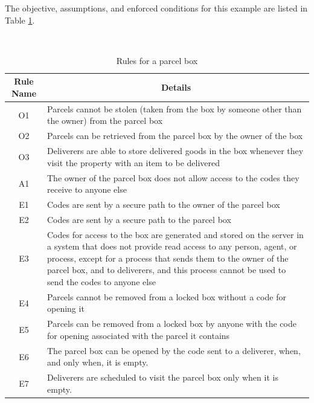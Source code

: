 The objective, assumptions, and enforced conditions for this example are listed
in Table \ref{parcelrules}.
\begin{table}[tb]
\centering
\caption{Rules for a parcel box}\label{parcelrules}\ \\
\begin{center}
\begin{tabular}{|c|p{9cm}|}
\hline
\bf Rule Name&\multicolumn{1}{|c|}{\bf Details}\\
\hline
O1 & Parcels cannot be stolen (taken from the box by someone other than the owner) from the parcel box\\
O2 & Parcels can be retrieved from the parcel box by the owner of the box\\
O3 & Deliverers are able to store delivered goods in the box whenever they visit the
property with an item to be delivered\\
A1 & The owner of the parcel box does not allow access to the codes they receive to anyone else\\
E1 & Codes are sent by a secure path to the owner of the parcel box\\
E2 & Codes are sent by a secure path to the parcel box\\
E3 & Codes for access to the box are generated and stored on the server in a system that does not 
provide read access to any person, agent, or process, except for a process that sends them to the owner 
of the parcel box, and to deliverers, and this process cannot be used to send the codes to anyone else\\
E4 & Parcels cannot be removed from a locked box without a code for opening it\\
E5 & Parcels can be removed from a locked box by anyone with the code for opening associated with the parcel it contains\\
E6 & The parcel box can be opened by the code sent to a deliverer, when, and only when, it is empty.\\
E7 & Deliverers are scheduled to visit the parcel box only when it is empty.\\
\hline
\end{tabular}
\end{center}
\end{table}

